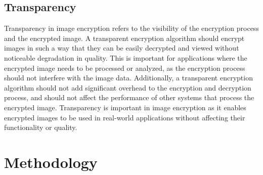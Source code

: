 \documentclass[11pt,a4paper,english]{article}
\begin{document}
\subsection{Transparency}Transparency in image encryption refers to the visibility of the encryption process and the encrypted image. A transparent encryption algorithm should encrypt images in such a way that they can be easily decrypted and viewed without noticeable degradation in quality. This is important for applications where the encrypted image needs to be processed or analyzed, as the encryption process should not interfere with the image data. Additionally, a transparent encryption algorithm should not add significant overhead to the encryption and decryption process, and should not affect the performance of other systems that process the encrypted image. Transparency is important in image encryption as it enables encrypted images to be used in real-world applications without affecting their functionality or quality.
\newpage
\section{Methodology}
\end{document}
